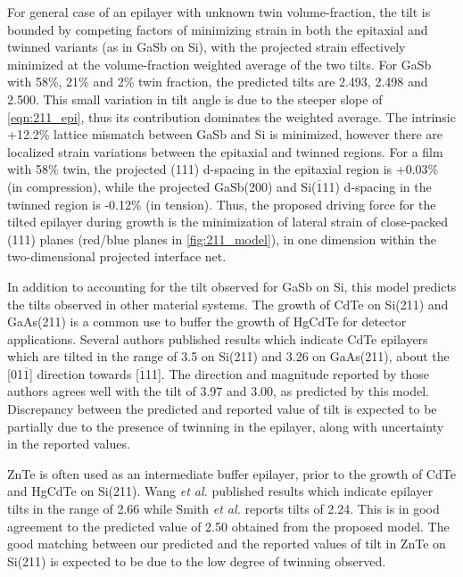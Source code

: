 For general case of an epilayer with unknown twin volume-fraction, the tilt is bounded by competing factors of minimizing strain in both the epitaxial and twinned variants (as in GaSb on Si), with the projected strain effectively minimized at the volume-fraction weighted average of the two tilts.
For GaSb with 58\%, 21\% and 2\% twin fraction, the predicted tilts are 2.493\degree{}, 2.498\degree{} and 2.500\degree{}.
This small variation in tilt angle is due to the steeper slope of \cref{eqn:211_epi}, thus its contribution dominates the weighted average.
The intrinsic +12.2\% lattice mismatch between GaSb and Si is minimized, however there are localized strain variations between the epitaxial and twinned regions.
For a film with 58\% twin, the projected (111) d-spacing in the epitaxial region is +0.03\% (in compression), while the projected GaSb(200) and Si(\(\overline{1}\)11) d-spacing in the twinned region is -0.12\% (in tension).
Thus, the proposed driving force for the tilted epilayer during growth is the minimization of lateral strain of close-packed (111) planes (red/blue planes in \cref{fig:211_model}), in one dimension within the two-dimensional projected interface net.

In addition to accounting for the tilt observed for GaSb on Si, this model predicts the tilts observed in other material systems.
The growth of CdTe on Si(211) and GaAs(211) is a common use to buffer the growth of HgCdTe for detector applications.
Several authors\cite{Triboulet2009,Yu1999,Lange1991} published results which indicate CdTe epilayers which are tilted in the range of 3.5\degree{} on Si(211)\cite{Zhao2011} and 3.26\degree{} on GaAs(211)\cite{Johnson2011}, about the [01\(\overline{1}\)] direction towards [\(\overline{1}\)11].
The direction and magnitude reported by those authors agrees well with the tilt of 3.97\degree{} and 3.00\degree{}, as predicted by this model.
Discrepancy between the predicted and reported value of tilt is expected to be partially due to the presence of twinning in the epilayer, along with uncertainty in the reported values.

ZnTe is often used as an intermediate buffer epilayer, prior to the growth of CdTe and HgCdTe on Si(211)\cite{Zhao2011,Dhar1997a}.
Wang \textit{et al.}\cite{Wang2011a} published results which indicate epilayer tilts in the range of 2.66\degree{} while Smith \textit{et al.}\cite{smith2012_znte} reports tilts of 2.24\degree{}.
This is in good agreement to the predicted value of 2.50\degree{} obtained from the proposed model.
The good matching between our predicted and the reported values of tilt in ZnTe on Si(211) is expected to be due to the low degree of twinning observed.

